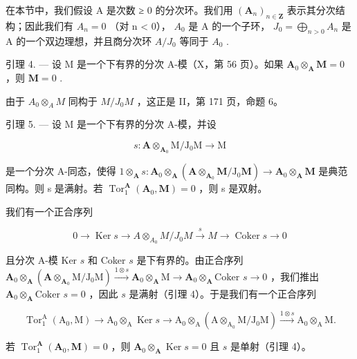 在本节中，我们假设 A 是次数 ≥ 0 的分次环。我们用 \((\mathbf{A}_{n})_{n \in \mathbf{Z}}\) 表示其分次结构；因此我们有 \(A_{n} = 0\) （对 n \textless{} 0）， \(A_{0}\) 是 A 的一个子环， \(J_{0} = \bigoplus_{n > 0} A_{n}\) 是 A 的一个双边理想，并且商分次环 \(A/J_{0}\) 等同于 \(A_{0}\) .

引理 4. --- 设 M 是一个下有界的分次 A-模（X，第 56 页）。如果 \(\mathbf{A}_0\otimes_{\mathbf{A}}\mathbf{M} = 0\) ，则 \(\mathbf{M} = 0\) .

由于 \(A_{0} \otimes_{A} M\) 同构于 \(M/J_{0} M\) ，这正是 II，第 171 页，命题 6。

引理 5. --- 设 M 是一个下有界的分次 A-模，并设

\[
s: \mathbf {A} \otimes_ {\mathbf {A} _ {0}} \mathrm{M} / \mathrm{J} _ {0} \mathrm{M} \rightarrow \mathrm{M}
\]

是一个分次 A-同态，使得 \(1 \otimes_{\mathbf{A}} s: \mathbf{A}_0 \otimes_{\mathbf{A}} (\mathbf{A} \otimes_{\mathbf{A}_0} \mathbf{M} / \mathrm{J}_0 \mathbf{M}) \to \mathbf{A}_0 \otimes_{\mathbf{A}} \mathbf{M}\) 是典范同构。则 s 是满射。若 \(\operatorname{Tor}_1^{\mathbf{A}}(\mathbf{A}_0, \mathbf{M}) = 0\) ，则 s 是双射。

我们有一个正合序列

\[
0 \rightarrow \operatorname{Ker} s \rightarrow A \otimes_ {A _ {0}} M / J _ {0} M \xrightarrow {s} M \rightarrow \operatorname{Coker} s \rightarrow 0
\]

且分次 A-模 Ker \(s\) 和 Coker \(s\) 是下有界的。由正合序列 \(\mathbf{A}_{0} \otimes_{\mathbf{A}} (\mathbf{A} \otimes_{\mathbf{A}_{0}} \mathrm{M} / \mathrm{J}_{0} \mathrm{M}) \xrightarrow{1 \otimes s} \mathbf{A}_{0} \otimes_{\mathbf{A}} \mathrm{M} \to \mathbf{A}_{0} \otimes_{\mathbf{A}} \text{Coker } s \to 0\) ，我们推出 \(\mathbf{A}_{0} \otimes_{\mathbf{A}} \text{Coker } s = 0\) ，因此 \(s\) 是满射（引理 4）。于是我们有一个正合序列

\[
\operatorname{Tor} _ {1} ^ {\mathrm{A}} \left(\mathrm{A} _ {0}, \mathrm{M}\right)\rightarrow \mathrm{A} _ {0} \otimes_ {\mathrm{A}} \operatorname{Ker} s \rightarrow \mathrm{A} _ {0} \otimes_ {\mathrm{A}} \left(\mathrm{A} \otimes_ {\mathrm{A} _ {0}} \mathrm{M} / \mathrm{J} _ {0} \mathrm{M}\right) \xrightarrow {1 \otimes s} \mathrm{A} _ {0} \otimes_ {\mathrm{A}} \mathrm{M}.
\]

若 \(\operatorname{Tor}_1^{\mathbf{A}}(\mathbf{A}_0, \mathbf{M}) = 0\) ，则 \(\mathbf{A}_0 \otimes_{\mathbf{A}} \operatorname{Ker} s = 0\) 且 \(s\) 是单射（引理 4）。

